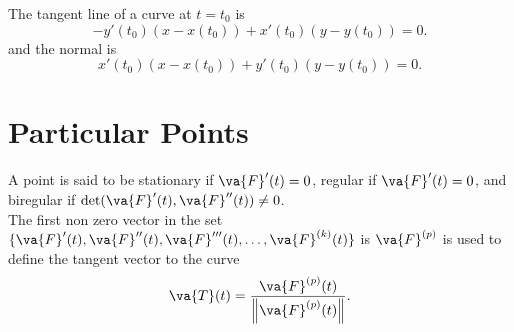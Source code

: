 \begin{remark}
	The tangent line of a curve at $t=t_0$ is
	\[
		-y'(t_0)(x-x(t_0)) + x'(t_0)(y-y(t_0))=0
		.\]
	and the normal is
	\[
		x'(t_0)(x-x(t_0))+y'(t_0)(y-y(t_0))=0
		.\]
\end{remark}

\section{Particular Points}

A point is said to be stationary if $\va{F}'(t) = 0$, regular if $\va{F}'(t)=0$, and biregular if $\det(\va{F}'(t),\va{F}''(t))\neq 0$.\\

The first non zero vector in the set $\{\va{F}'(t),\va{F}''(t),\va{F}'''(t),\ldots,\va{F}^{(k)}(t)\} $ is $\va{F}^{(p)}$ is used to define the tangent vector to the curve
\[
	\va{T}(t) = \frac{\va{F}^{(p)}(t)}{\left\| \va{F}^{(p)}(t) \right\| }
	.\]

